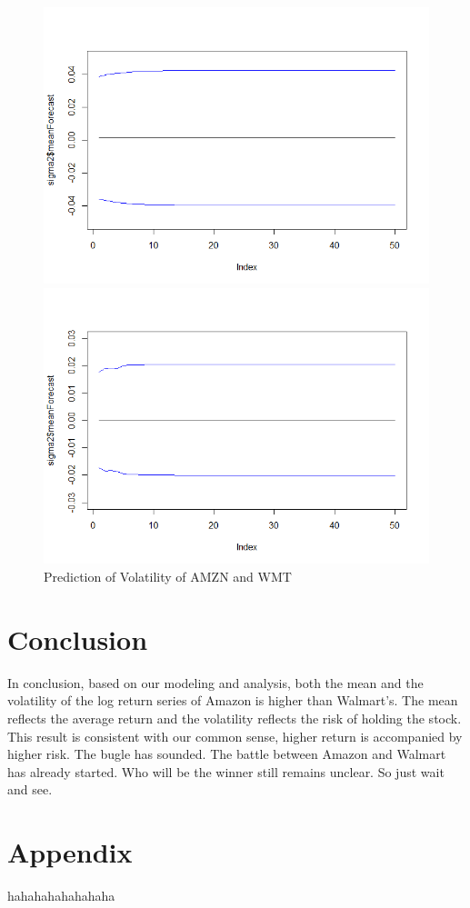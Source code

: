 \documentclass[paper=a4, fontsize=11pt]{article}
\begin{document}
\begin{figure}[!htbp]
\begin{minipage}[!htbp]{0.5\linewidth}
\centering
\includegraphics[scale = 0.45]{img/predict_AMZN}
\end{minipage}
\begin{minipage}[!htbp]{0.5\linewidth}
\centering
\includegraphics[scale = 0.45]{img/predict_WMT}
\end{minipage}
\caption{Prediction of Volatility of AMZN and WMT}
\label{predict}
\end{figure}
\newpage

\section{Conclusion}
In conclusion, based on our modeling and analysis, both the mean and the volatility of the log return series of Amazon is higher than Walmart’s. The mean reflects the average return and the volatility reflects the risk of holding the stock. This result is consistent with our common sense, higher return is accompanied by higher risk.  
The bugle has sounded. The battle between Amazon and Walmart has already started. Who will be the winner still remains unclear. So just wait and see.

\section{Appendix}

\begin{thebibliography}{99}
 hahahahahahahaha
\end{thebibliography}
\end{document}
